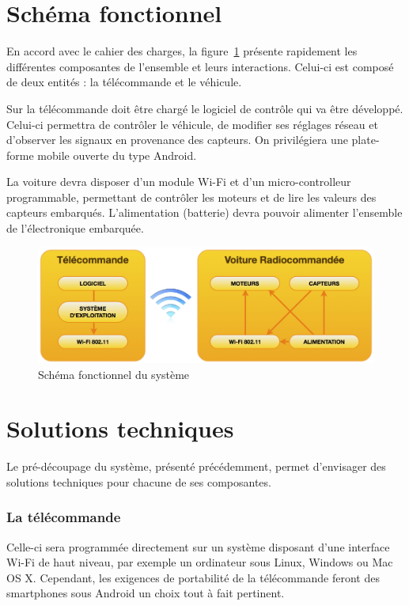 \documentclass[a4paper,12pt]{report}
\begin{document}
	\section{Schéma fonctionnel}
	En accord avec le cahier des charges, la figure~\ref{schemafonctionnel} présente rapidement les différentes composantes de l’ensemble et leurs interactions. Celui-ci est composé de deux entités : la télécommande et le véhicule.

Sur la télécommande doit être chargé le logiciel de contrôle qui va être développé. Celui-ci permettra de contrôler le véhicule, de modifier ses réglages réseau et d’observer les signaux en provenance des capteurs. On privilégiera une plate-forme mobile ouverte du type Android.

La voiture devra disposer d’un module Wi-Fi et d’un micro-controlleur programmable, permettant de contrôler les moteurs et de lire les valeurs des capteurs embarqués. L’alimentation (batterie) devra pouvoir alimenter l’ensemble de l’électronique embarquée.

\begin{figure}%
	\begin{center}
		\includegraphics[scale=0.75]{images/schemafonctionnel.png}
	\end{center}
	\caption{Schéma fonctionnel du système}
	\label{schemafonctionnel}
\end{figure}

		\section{Solutions techniques}
		Le pré-découpage du système, présenté précédemment, permet d’envisager des solutions techniques pour chacune de ses composantes.
		
		\subsubsection{La télécommande}
		Celle-ci sera programmée directement sur un système disposant d’une interface Wi-Fi de haut niveau, par exemple un ordinateur sous Linux, Windows ou Mac OS X. Cependant, les exigences de portabilité de la télécommande feront des smartphones sous Android un choix tout à fait pertinent.
		
		\paragraph{}
\end{document}
